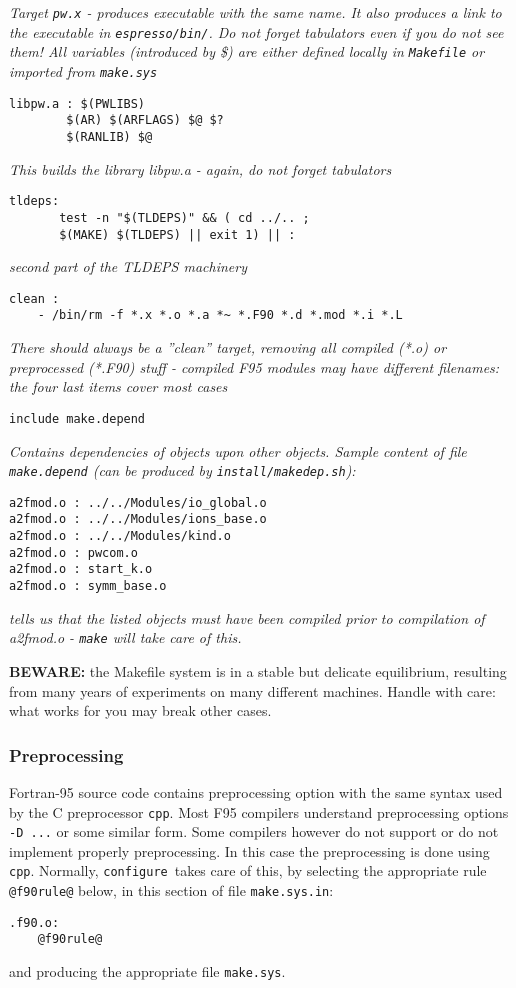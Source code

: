 \documentclass[12pt,a4paper]{article}
\def\configure{\texttt{configure}}
\def\make.sys{\texttt{make.sys}}
\begin{document}
{\em Target {\tt pw.x} - produces executable with the same name.
It also produces a link to the executable in {\tt espresso/bin/}.
Do not forget tabulators even if you do not see them!
All variables (introduced by \$) are either defined locally
in {\tt Makefile} or imported from {\tt make.sys}}
\begin{verbatim}
libpw.a : $(PWLIBS)
        $(AR) $(ARFLAGS) $@ $?
        $(RANLIB) $@
\end{verbatim}
{\em This builds the library libpw.a - again, do not forget tabulators}
\begin{verbatim}
tldeps:
       test -n "$(TLDEPS)" && ( cd ../.. ;
       $(MAKE) $(TLDEPS) || exit 1) || :
\end{verbatim}
{\em second part of the TLDEPS machinery}
\begin{verbatim}
clean :
    - /bin/rm -f *.x *.o *.a *~ *.F90 *.d *.mod *.i *.L
\end{verbatim}
{\em There should always be a ''clean'' target, removing all compiled (*.o)
or preprocessed (*.F90) stuff - compiled F95 modules may have different
filenames: the four last items cover most cases}
\begin{verbatim}
include make.depend
\end{verbatim}
{\em Contains dependencies of objects upon other objects. Sample
content of file {\tt make.depend} (can be produced by {\tt install/makedep.sh}):}
\begin{verbatim}
a2fmod.o : ../../Modules/io_global.o
a2fmod.o : ../../Modules/ions_base.o
a2fmod.o : ../../Modules/kind.o
a2fmod.o : pwcom.o
a2fmod.o : start_k.o
a2fmod.o : symm_base.o
\end{verbatim}
{\em tells us that the listed objects must have been compiled
prior to compilation of a2fmod.o - {\tt make} will take care of this.}

{\bf BEWARE:} the Makefile system is in a stable but delicate equilibrium,
resulting from many years of experiments on many different machines.
Handle with care: what works for you may break other cases.

\subsubsection{Preprocessing}

\label{SubSec:CPP}
Fortran-95 source code contains preprocessing option with 
the same syntax used by the C preprocessor \texttt{cpp}.
Most F95 compilers understand preprocessing options \texttt{-D ...}
or some similar form. Some compilers however do not support
or do not implement properly preprocessing. In this case the
preprocessing is done using \texttt{cpp}. 
Normally, \configure\ takes care of this, by selecting the
appropriate rule \texttt{@f90rule@} below, in this section
of file \texttt{make.sys.in}:
\begin{verbatim}
.f90.o:
	@f90rule@
\end{verbatim}
and producing the appropriate file \make.sys.
\end{document}
